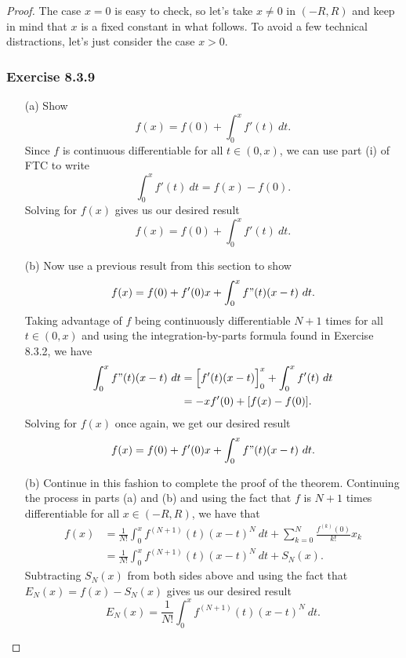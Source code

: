 \begin{proof}
The case \( x = 0  \) is easy to check, so let's take \( x \neq 0  \) in \( (-R ,R ) \) and keep in mind that \( x  \) is a fixed constant in what follows. To avoid a few technical distractions, let's just consider the case \( x > 0  \).

\subsubsection{Exercise 8.3.9} 
\begin{enumerate}
    \item[(a)] Show 
        \[  f(x) = f(0) + \int_{ 0 }^{ x }  f'(t) \  dt. \]
            Since \( f  \) is continuous differentiable for all  \( t \in (0,x) \), we can use part (i) of FTC to write 
        \[  \int_{ 0 }^{ x } f'(t)  \ dt =  f(x) - f(0). \] Solving for \( f(x)  \) gives us our desired result 
        \[ f(x) = f(0) + \int_{ 0 }^{ x }  f'(t) \ dt. \]
    \item[(b)] Now use a previous result from this section to show 
        \[  f(x) = f(0) + f'(0) x + \int_{ 0 }^{ x }  f"(t)(x-t) \  dt. \]
            Taking advantage of \( f  \) being continuously differentiable \( N+1  \) times for all \(  t \in (0,x) \) and using the integration-by-parts formula found in Exercise 8.3.2, we have 
            \begin{align*}  \int_{ 0 }^{ x }  f"(t) (x -t ) \  dt &= \Big[ f'(t) (x-t) \Big]_{0}^{x} + \int_{ 0 }^{ x }  f'(t) \  dt \\
            &= -x f'(0) + [ f(x) - f(0)].  
            \end{align*}
            Solving for \( f(x)  \) once again, we get our desired result
        \[  f(x) = f(0) + f'(0) x + \int_{ 0 }^{ x }  f"(t)(x-t) \  dt. \]
    \item[(b)] Continue in this fashion to complete the proof of the theorem.
        Continuing the process in parts (a) and (b) and using the fact that \( f  \) is \( N+1  \) times differentiable for all \( x \in (-R ,R ) \), we have that
        \begin{align*}  f(x) &= \frac{ 1 }{ N! }  \int_{ 0 }^{ x  } f^{(N+1)}(t) (x -t )^{N} \  dt + \sum_{ k=0  }^{ N  } \frac{ f^{(k)}(0) }{ k! } x_{k } \\  
            &= \frac{ 1 }{ N! } \int_{ 0 }^{ x }  f^{(N+1)}(t) (x-t)^{N} \   dt + S_{N}(x).
        \end{align*}
        Subtracting \( S_{N}(x)  \) from both sides above and using the fact that \( E_{N}(x) = f(x) - S_{N}(x)  \) gives us our desired result 
    \[  E_{N}(x) = \frac{ 1 }{ N! } \int_{ 0 }^{ x  }  f^{(N+1) }(t) (x-t)^{N} \  dt.  \]
\end{enumerate}
\end{proof}

